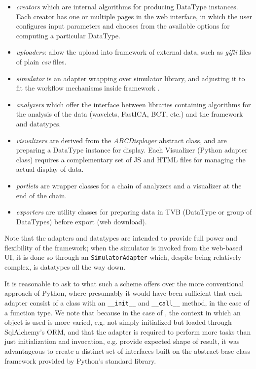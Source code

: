 \begin{itemize}
	\item \textit{creators} which are internal algorithms for producing DataType instances. 
		Each creator has one or multiple pages in the web interface, in which the user
		 configures input parameters and chooses from the available options for computing a particular DataType.

	\item \textit{uploaders}: allow the upload into \TVB framework of external data, 
    		such as \emph{gifti} files of plain \emph{csv} files.

	\item \textit{simulator} is an adapter wrapping over \TVB simulator library, and adjusting it to fit
		the workflow mechanisms inside \TVB framework .

	\item \textit{analyzers} which offer the interface between libraries containing algorithms 
		for the analysis of the data (wavelets, FastICA, BCT, etc.) and the \TVB framework and datatypes.

	\item \textit{visualizers} are derived from the \emph{ABCDisplayer} abstract class, and are preparing  
		a DataType instance for display. Each Visualizer (Python adapter class) requires a complementary set
		of JS and HTML files for managing the actual display of data.

	\item \textit{portlets} are wrapper classes for a chain of analyzers and a visualizer at the end of the chain.

	\item \textit{exporters} are utility classes for preparing data in TVB (DataType or group of DataTypes)
		before export (web download).
\end{itemize}

Note that the adapters and datatypes are intended to provide full 
power and flexibility of the framework; when the simulator is invoked from
the web-based UI, it is done so through an \texttt{SimulatorAdapter} which,
despite being relatively complex, is datatypes all the way down.

It is reasonable to ask to what such a scheme offers over the more 
conventional approach of Python, where presumably it would have been
sufficient that each adapter consist of a class with an \texttt{\_\_init\_\_}
and \texttt{\_\_call\_\_} method, in the case of a function type. 
We note that because in the case of \TVB, the context in which an object
is used is more varied, e.g. not simply initialized but loaded through 
SqlAlchemy's ORM, and that the adapter is required to perform more tasks
than just initialization and invocation, e.g. provide expected shape of 
result, it was advantageous to create a distinct set of interfaces built
on the abstract base class framework provided by Python's standard library.

